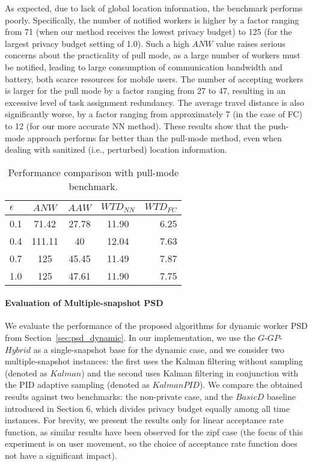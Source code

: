 \documentclass{USC-Thesis}
\newcommand{\tn}{\tabularnewline}
\numberwithin{equation}{chapter}
\begin{document}
As expected, due to lack of global location information, the benchmark performs poorly. Specifically, the number of notified workers is higher by a factor ranging from 71 (when our method receives the lowest privacy budget) to 125 (for the largest privacy budget setting of 1.0). Such a high $\mathit{ANW}$ value raises serious concerns about the practicality of pull mode, as a large number of workers must be notified, leading to large consumption of communication bandwidth and battery, both scarce resources for mobile users. The number of accepting workers is larger for the pull mode by a factor ranging from 27 to 47, resulting in an excessive level of task assignment redundancy. The average travel distance is also significantly worse, by a factor ranging from approximately 7 (in the case of FC) to 12 (for our more accurate NN method). These results show that the push-mode approach performs far better than the pull-mode method, even when dealing with sanitized (i.e., perturbed) location information.

\begin{table}[ht]
\begin{center}
\footnotesize
\begin{tabular}{ l | c | c | c | r}
\textbf{$\epsilon$} & \textbf{$\mathit{ANW}$} & \textbf{$\mathit{AAW}$} & \textbf{$\mathit{WTD_{NN}}$} & \textbf{$\mathit{WTD_{FC}}$} \tn
\hline
0.1 & 71.42 & 27.78 & 11.90 & 6.25 \tn
\hline
0.4 & 111.11 & 40 & 12.04 & 7.63 \tn
\hline
0.7 & 125 & 45.45 & 11.49 & 7.87 \tn
\hline
1.0 & 125 & 47.61 & 11.90 & 7.75 \tn
\end{tabular}
\caption{Performance comparison with pull-mode benchmark.}
\label{tab:privacy_wst}
\end{center}
\end{table}


\paragraph{Evaluation of Multiple-snapshot PSD}
\label{sec:results2}

We evaluate the performance of the proposed algorithms for dynamic worker PSD from Section~\ref{sec:psd_dynamic}. In our implementation, we use the $G$-$\mathit{GP}$-$\mathit{Hybrid}$ as a single-snapshot base for the dynamic case, and we consider two multiple-snapshot instances: the first uses the Kalman filtering without sampling (denoted as $\mathit{Kalman}$) and the second uses Kalman filtering in conjunction with the PID adaptive sampling (denoted as $\mathit{KalmanPID}$).
We compare the obtained results against two benchmarks: the non-private case, and the $\mathit{BasicD}$ baseline introduced in Section 6, which divides privacy budget equally among all time instances. For brevity, we present the results only for linear acceptance rate function, as similar results have been observed for the zipf case (the focus of this experiment is on user movement, so the choice of acceptance rate function does not have a significant impact).
\end{document}

